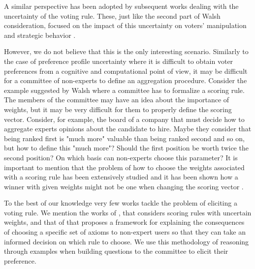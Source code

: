 \textit{}

A similar perspective has been adopted by subsequent works dealing with the uncertainty of the voting rule. These, just like the second part of Walsh consideration, focused on the impact of this uncertainty on voters' manipulation and strategic behavior \citep{Baumeister2011,Elkind2012,Holliday2019}.

However, we do not believe that this is the only interesting scenario. Similarly to the case of preference profile uncertainty where it is difficult to obtain voter preferences from a cognitive and computational point of view, it may be difficult for a committee of non-experts to define an aggregation procedure. 
Consider the example suggested by Walsh where a committee has to formalize a scoring rule. The members of the committee may have an idea about the importance of weights, but it may be very difficult for them to properly define the scoring vector. 
Consider, for example, the board of a company that must decide how to aggregate experts opinions about the candidate to hire. Maybe they consider that being ranked first is "much more" valuable than being ranked second and so on, but how to define this "much more"? Should the first position be worth twice the second position? On which basis can non-experts choose this parameter?
It is important to mention that the problem of how to choose the weights associated with a scoring rule has been extensively studied and it has been shown how a winner with given weights might not be one when changing the scoring vector \citep{Cook1990,Llamazares2013,Llamazares2016}. 

To the best of our knowledge very few works tackle the problem of eliciting a voting rule. We mention the works of \citet{Llamazares2013,Viappiani2018}, that considers scoring rules with uncertain weights, and that of \citet{Cailloux2014} that proposes a framework for explaining the consequences of choosing a specific set of axioms to non-expert users so that they can take an informed decision on which rule to choose.
We use this methodology of reasoning through examples when building questions to the committee to elicit their preference.

